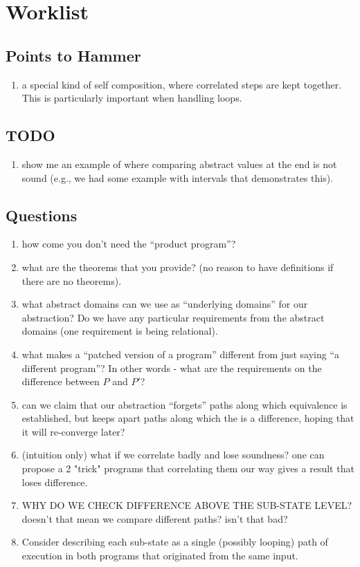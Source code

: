 \section{Worklist}

\subsection{Points to Hammer}

\begin{enumerate}
\item a special kind of self composition, where correlated steps are kept together. This is particularly important when handling loops.
\end{enumerate}

\subsection{TODO}
\begin{enumerate}
\item show me an example of where comparing abstract values at the end is not sound (e.g., we had some example with intervals that demonstrates this).
\end{enumerate}


\subsection{Questions}

\begin{enumerate}
\item how come you don't need the ``product program''?
\item what are the theorems that you provide? (no reason to have definitions if there are no theorems).
\item what abstract domains can we use as ``underlying domains'' for our abstraction? Do we have any particular requirements from the abstract domains (one requirement is being relational).
\item what makes a ``patched version of a program'' different from just saying ``a different program''? In other words - what are the requirements on the difference between $P$ and $P'$?
\item can we claim that our abstraction ``forgets'' paths along which equivalence is established, but keeps apart paths along which the is a difference, hoping that it will re-converge later?
\item (intuition only) what if we correlate badly and lose soundness? one can propose a 2 "trick" programs that correlating them our way gives a result that loses difference.
\item WHY DO WE CHECK DIFFERENCE ABOVE THE SUB-STATE LEVEL? doesn't that mean we compare different paths? isn't that bad?
\item Consider describing each sub-state as a single (possibly looping) path of execution in both programs that originated from the same input.
\end{enumerate} 